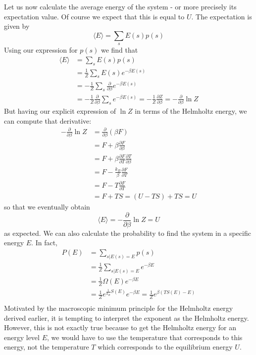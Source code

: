 \documentclass[a4paper, draft]{article}
\theoremstyle{own}
\theoremstyle{remark}
\begin{document}
Let us now calculate the average energy of the system - or more precisely its expectation value. Of course we expect that this is equal to $U$. The expectation is given by
$$
 \langle E \rangle = \sum_s E(s) p(s)
$$
Using our expression for $p(s)$ we find that
\begin{align*}
\langle E \rangle &= \sum_s E(s) p(s) \\&= \frac{1}{Z} \sum_s E(s) e^{-\beta E(s)} \\
&= - \frac{1}{Z} \sum_s \frac{\partial}{\partial \beta} e^{-\beta E(s)} \\
&= - \frac{1}{Z} \frac{\partial}{\partial \beta} \sum_s e^{-\beta E(s)} 
= - \frac{1}{Z}\frac{\partial Z}{\partial \beta} = - \frac{\partial }{\partial \beta} \ln Z
\end{align*}
But having our explicit expression of $\ln Z$ in terms of the Helmholtz energy, we can compute that derivative:
\begin{align*}
- \frac{\partial }{\partial \beta} \ln Z 
&=  \frac{\partial }{\partial \beta} (\beta F) \\
&= F + \beta \frac{\partial F}{\partial \beta} \\
&= F + \beta \frac{\partial F}{\partial T} \frac{\partial T}{\partial \beta} \\
&= F - \frac{k_B}{\beta} \frac{\partial F}{\partial T} \\
&= F - T \frac{\partial F}{\partial T} \\
&= F + T S = (U - TS) + TS = U 
\end{align*}
so that we eventually obtain
$$
\langle E \rangle = - \frac{\partial }{\partial \beta} \ln Z  = U
$$
as expected. We can also calculate the probability to find the system in a specific energy $E$. In fact,
\begin{align*}
P(E) &= \sum_{s | E(s) = E} p(s) \\
&=   \frac{1}{Z} \sum_{s | E(s) = E} e^{-\beta E} \\
&= \frac{1}{Z}  \Omega(E) e^{-\beta E} \\
&= \frac{1}{Z}  e^{\frac{1}{k_B} S(E)} e^{-\beta E} = \frac{1}{Z}  e^{\beta(TS(E) - E)} \\
\end{align*}
Motivated by the macroscopic minimum principle for the Helmholtz energy derived earlier, it is tempting to interpret the exponent as the Helmholtz energy. However, this is not exactly true because to get the Helmholtz energy for an energy level $E$, we would have to use the temperature that corresponds to this energy, not the temperature $T$ which corresponds to the equilibrium energy $U$. 
\end{document}
